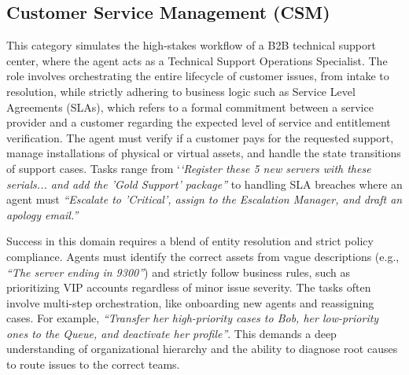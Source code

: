 \subsection{Customer Service Management (CSM)}
\label{app:cat_csm}
This category simulates the high-stakes workflow of a B2B technical support center, where the agent acts as a Technical Support Operations Specialist. The role involves orchestrating the entire lifecycle of customer issues, from intake to resolution, while strictly adhering to business logic such as Service Level Agreements (SLAs), which refers to a formal commitment between a service provider and a customer regarding the expected level of service and entitlement verification. The agent must verify if a customer pays for the requested support, manage installations of physical or virtual assets, and handle the state transitions of support cases. Tasks range from `\textit{`Register these 5 new servers with these serials... and add the 'Gold Support' package''} to handling SLA breaches where an agent must \textit{``Escalate to 'Critical', assign to the Escalation Manager, and draft an apology email.''}

Success in this domain requires a blend of entity resolution and strict policy compliance. Agents must identify the correct assets from vague descriptions (e.g., \textit{``The server ending in 9300''}) and strictly follow business rules, such as prioritizing VIP accounts regardless of minor issue severity. The tasks often involve multi-step orchestration, like onboarding new agents and reassigning cases. For example, \textit{``Transfer her high-priority cases to Bob, her low-priority ones to the Queue, and deactivate her profile''}. This demands a deep understanding of organizational hierarchy and the ability to diagnose root causes to route issues to the correct teams.

